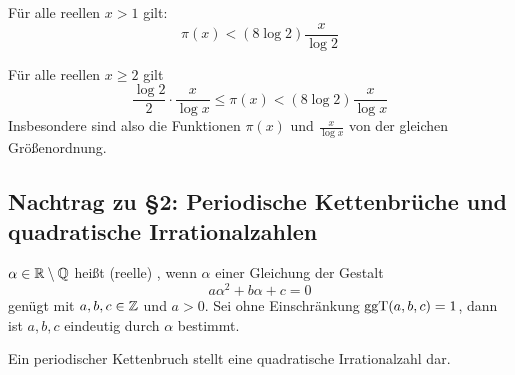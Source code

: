 \begin{falko} \label{F8.14}
	Für alle reellen $x > 1$ gilt:
	\begin{equation}
		\pi(x) < (8 \log 2) \frac{x}{\log 2} \label{eq_F8.14}
	\end{equation}
\end{falko}

\begin{satz} \label{satz_8.3}
	Für alle reellen $x \geq 2$ gilt
	\begin{equation}
		\frac{\log 2}{2} \cdot \frac{x}{\log x} \leq \pi(x) < (8 \log 2) \frac{x}{\log x} \label{eq_satz_8.3}
	\end{equation}
	Insbesondere sind also die Funktionen $\pi(x)$ und $\frac{x}{\log x}$ von der gleichen Größenordnung.
\end{satz}

\subsection{Nachtrag zu §2: Periodische Kettenbrüche und quadratische Irrationalzahlen}
	$\alpha \in \mathbb{R} \setminus \mathbb{Q}$ heißt (reelle) , wenn $\alpha$ einer Gleichung der Gestalt
	\begin{equation}
		a \alpha^2 + b \alpha + c = 0 \label{eq_quad_gl}
	\end{equation}
	genügt mit $a,b,c \in \mathbb{Z}$ und $a > 0$. Sei ohne Einschränkung $\operatorname{ggT}(a,b,c) = 1$, dann ist $a,b,c$ eindeutig durch $\alpha$ bestimmt.
	
\begin{falko} \label{F8.1_2}
	Ein periodischer Kettenbruch stellt eine quadratische Irrationalzahl dar. 
\end{falko}
\newpage